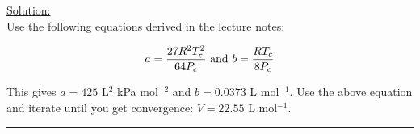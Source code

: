 \noindent
\underline{Solution:}\\

Use the following equations derived in the lecture notes:

$$a = \frac{27R^2T_c^2}{64P_c}\textnormal{ and }b = \frac{RT_c}{8P_c}$$

This gives $a = 425$ L$^2$ kPa mol$^{-2}$ and $b = 0.0373$ L mol$^{-1}$. Use the above equation and iterate until you get convergence: $V = 22.55$ L mol$^{-1}$.

\hrule\vspace{0.5cm}
